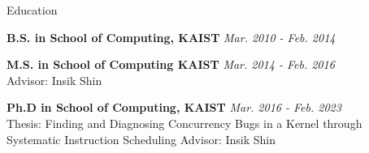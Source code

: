 
\begin{rSection}{Education}

\textbf{B.S. in School of Computing, KAIST} \hfill {\em Mar. 2010 - Feb. 2014}

\textbf{M.S. in School of Computing KAIST} \hfill {\em Mar. 2014 - Feb. 2016} \\
Advisor: Insik Shin

\textbf{Ph.D in School of Computing, KAIST} \hfill {\em Mar. 2016 - Feb. 2023} \\
Thesis: Finding and Diagnosing Concurrency Bugs in a Kernel through Systematic Instruction Scheduling
Advisor: Insik Shin

\end{rSection}
